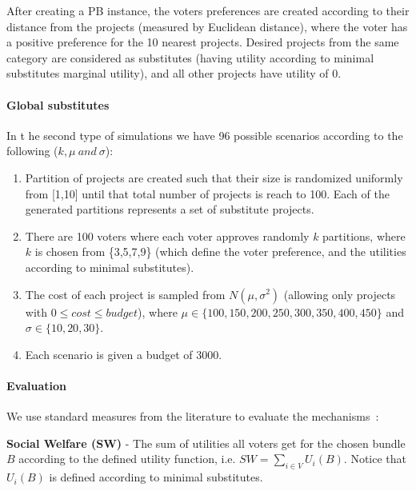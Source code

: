 \documentclass[runningheads]{llncs}
\begin{document}
After creating a PB instance, the voters preferences are created according to their distance from the projects (measured by Euclidean distance), where the voter has a positive preference for the 10 nearest projects. Desired projects from the same category are considered  as substitutes (having utility according to minimal substitutes marginal utility), and all other projects have utility of 0.


\paragraph{Global substitutes} In t he second type of simulations we have 96 possible scenarios according to the following ($k, \mu \ and\  \sigma$):


\begin{enumerate}
    \item Partition of projects are created such that their size is randomized uniformly from [1,10] until that total number of projects is reach to 100. Each of the generated partitions represents a set of substitute projects.
    
    
    \item There are 100 voters where each voter approves randomly $k$ partitions, where $k$ is chosen from \{3,5,7,9\} (which define the voter preference, and the utilities according to minimal substitutes). 
    
    \item The cost of each project is sampled from  $N(\mu,\sigma^2)$ (allowing only projects with $0\leq cost\leq budget$), where $\mu\in\{100,150,200,250,300,350,400,450\}$ and $\sigma\in\{10,20,30\}$.
    
    \item Each scenario is given a budget of 3000.
\end{enumerate}

\paragraph{Evaluation}

We use standard measures from the literature to evaluate the mechanisms~\cite{skowron2020participatory}:

\textbf{Social Welfare (SW)} - The sum of utilities all voters get for the chosen bundle $B$ according to the defined utility function, i.e. $SW = \sum_{i\in V}U_i(B)$. Notice that $U_i(B)$ is defined according to minimal substitutes.
\end{document}
